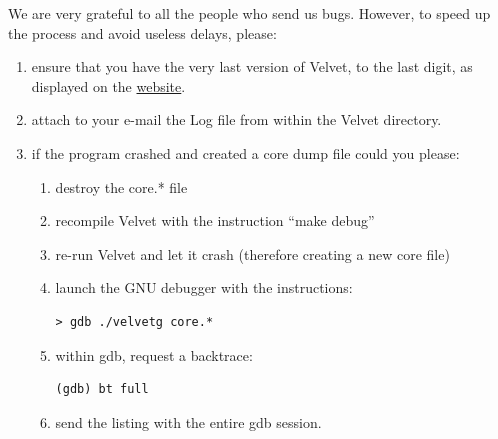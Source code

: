 \documentclass{article}
\begin{document}
We are very grateful to all the people who send us bugs. However, to speed up the process and avoid useless delays, please:
\begin{enumerate}
\item ensure that you have the very last version of Velvet, to the last digit, as displayed on the \href{http://www.ebi.ac.uk/~zerbino/velvet/}{website}.
\item attach to your e-mail the Log file from within the Velvet directory.
\item if the program crashed and created a core dump file could you please:
\begin{enumerate}
\item destroy the core.* file
\item recompile Velvet with the instruction ``make debug''
\item re-run Velvet and let it crash (therefore creating a new core file)
\item launch the GNU debugger with the instructions:
\begin{verbatim}
> gdb ./velvetg core.*
\end{verbatim}
\item within gdb, request a backtrace:
\begin{verbatim}
(gdb) bt full
\end{verbatim}
\item send the listing with the entire gdb session.
\end{enumerate}
\end{enumerate}
\end{document}
